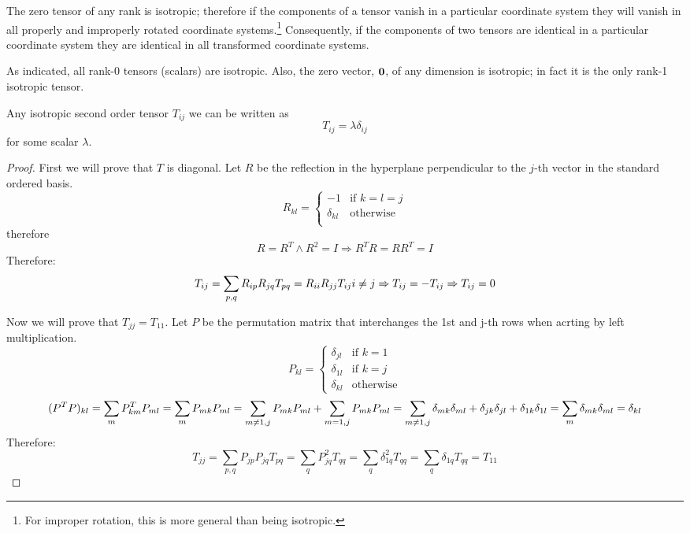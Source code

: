  The zero tensor of any rank is isotropic; therefore if
the components of a tensor vanish in a particular coordinate system
they will vanish in all properly and improperly rotated coordinate
systems.\footnote{For improper rotation, this is more general than being isotropic.}
Consequently, if the components of two tensors are identical in a
particular coordinate system they are identical in all transformed
coordinate systems.

 As indicated, all rank-0 tensors (scalars) are isotropic.
Also, the zero vector, $\mathbf{ 0}$, of any dimension is isotropic;
in fact it is the only rank-1 isotropic tensor.


\begin{theorem}
Any isotropic second order tensor $T_{ij}$ we can be written as 
\[T_{ij} = \lambda \delta_{ij}\] for some scalar $\lambda$.
\end{theorem}


\begin{proof}
First we will prove that $T$ is diagonal. Let
$R$ be the reflection in the hyperplane perpendicular to the $j$-th vector in the standard ordered basis.
$$R_{kl}=\begin{cases}
 -1 & \text{if }k=l=j\\
 \delta_{kl} & \text{otherwise}\\
\end{cases}$$ 
therefore 
$$R=R^T\land R^2=I\Rightarrow R^TR=RR^T=I$$
Therefore:
$$T_{ij}=\sum_{p,q}R_{ip}R_{jq}T_{pq}=R_{ii}R_{jj}T_{ij}\\
i\neq j\Rightarrow T_{ij}=-T_{ij}\Rightarrow T_{ij}=0$$

Now we will prove that  $T_{jj} = T_{11}$. Let  $P$ be the permutation matrix that interchanges the 1st and j-th rows when acrting by  left multiplication.
$$P_{kl}=\begin{cases}
 \delta_{jl} & \text{if } k=1\\
 \delta_{1l} & \text{if } k=j\\
 \delta_{kl} & \text{otherwise} 
\end{cases}$$
$$(P^TP)_{kl}=\sum_{m}P^T_{km}P_{ml}=\sum_{m}P_{mk}P_{ml}=\sum_{m\neq1,j}P_{mk}P_{ml}+\sum_{m=1,j}P_{mk}P_{ml}\\
=\sum_{m\neq1,j}\delta_{mk}\delta_{ml}+\delta_{jk}\delta_{jl}+\delta_{1k}\delta_{1l}=\sum_{m}\delta_{mk}\delta_{ml}=\delta_{kl}$$
Therefore:
$$T_{jj}=\sum_{p,q}P_{jp}P_{jq}T_{pq}=\sum_{q}P_{jq}^2T_{qq}=\sum_{q}\delta_{1q}^2T_{qq}=\sum_{q}\delta_{1q}T_{qq}=T_{11}$$
\end{proof}



